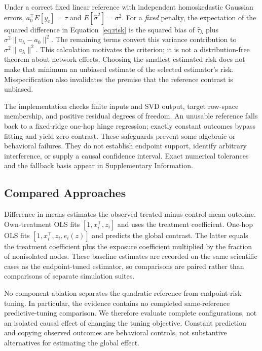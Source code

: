 \documentclass{article}
\newcommand{\gate}{\tau}
\begin{document}
Under a correct fixed linear reference with independent homoskedastic Gaussian errors, $a_0^\top E[y_c]=\gate$ and $E[\widehat\sigma^2]=\sigma^2$. For a \emph{fixed} penalty, the expectation of the squared difference in Equation~\ref{eq:risk} is the squared bias of $\widehat\gate_\lambda$ plus $\sigma^2\|a_\lambda-a_0\|^2$. The remaining terms convert this variance contribution to $\sigma^2\|a_\lambda\|^2$. This calculation motivates the criterion; it is not a distribution-free theorem about network effects. Choosing the smallest estimated risk does not make that minimum an unbiased estimate of the selected estimator's risk. Misspecification also invalidates the premise that the reference contrast is unbiased.

The implementation checks finite inputs and SVD output, target row-space membership, and positive residual degrees of freedom. An unusable reference falls back to a fixed-ridge one-hop hinge regression; exactly constant outcomes bypass fitting and yield zero contrast. These safeguards prevent some algebraic or behavioral failures. They do not establish endpoint support, identify arbitrary interference, or supply a causal confidence interval. Exact numerical tolerances and the fallback basis appear in Supplementary Information.

\subsection{Compared Approaches}
Difference in means estimates the observed treated-minus-control mean outcome. Own-treatment OLS fits $[1,x_i^\top,z_i]$ and uses the treatment coefficient. One-hop OLS fits $[1,x_i^\top,z_i,e_i(z)]$ and predicts the global contrast. The latter equals the treatment coefficient plus the exposure coefficient multiplied by the fraction of nonisolated nodes. These baseline estimates are recorded on the same scientific cases as the endpoint-tuned estimator, so comparisons are paired rather than comparisons of separate simulation suites.

No component ablation separates the quadratic reference from endpoint-risk tuning. In particular, the evidence contains no completed same-reference predictive-tuning comparison. We therefore evaluate complete configurations, not an isolated causal effect of changing the tuning objective. Constant prediction and copying observed outcomes are behavioral controls, not substantive alternatives for estimating the global effect.
\end{document}
